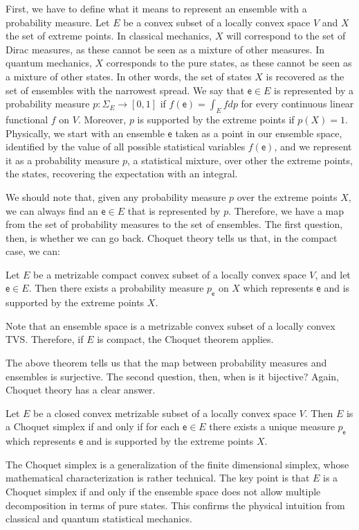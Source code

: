 \documentclass[10pt,twocolumn, nofootinbib]{revtex4-2}
\newcommand{\ens}[1][e] {\mathsf{#1}} %
\begin{document}
First, we have to define what it means to represent an ensemble with a probability measure. Let $E$ be a convex subset of a locally convex space $V$ and $X$ the set of extreme points. In classical mechanics, $X$ will correspond to the set of Dirac measures, as these cannot be seen as a mixture of other measures. In quantum mechanics, $X$ corresponds to the pure states, as these cannot be seen as a mixture of other states. In other words, the set of states $X$ is recovered as the set of ensembles with the narrowest spread. We say that $\ens \in E$ is represented by a probability measure $p : \Sigma_{E} \to [0,1]$ if $f(\ens) = \int_E f dp$ for every continuous linear functional $f$ on $V$. Moreover, $p$ is supported by the extreme points if $p(X) = 1$. Physically, we start with an ensemble $\ens$ taken as a point in our ensemble space, identified by the value of all possible statistical variables $f(\ens)$, and we represent it as a probability measure $p$, a statistical mixture, over other the extreme points, the states, recovering the expectation with an integral.

We should note that, given any probability measure $p$ over the extreme points $X$, we can always find an $\ens \in E$ that is represented by $p$. Therefore, we have a map from the set of probability measures to the set of ensembles. The first question, then, is whether we can go back. Choquet theory tells us that, in the compact case, we can:
\begin{thrm}[Choquet 1]
	Let $E$ be a metrizable compact convex subset of a locally convex space $V$, and let $\ens \in E$. Then there exists a probability measure $p_{\ens}$ on $X$ which represents $\ens$ and is supported by the extreme points $X$.
\end{thrm}
Note that an ensemble space is a metrizable convex subset of a locally convex TVS. Therefore, if $E$ is compact, the Choquet theorem applies.

The above theorem tells us that the map between probability measures and ensembles is surjective. The second question, then, when is it bijective? Again, Choquet theory has a clear answer.
\begin{thrm}[Choquet 2]
	Let $E$ be a closed convex metrizable subset of a locally convex space $V$. Then $E$ is a Choquet simplex if and only if for each $\ens \in E$ there exists a unique measure $p_{\ens}$ which represents $\ens$ and is supported by the extreme points $X$.
\end{thrm}
The Choquet simplex is a generalization of the finite dimensional simplex, whose mathematical characterization is rather technical. The key point is that $E$ is a Choquet simplex if and only if the ensemble space does not allow multiple decomposition in terms of pure states. This confirms the physical intuition from classical and quantum statistical mechanics.
\end{document}
